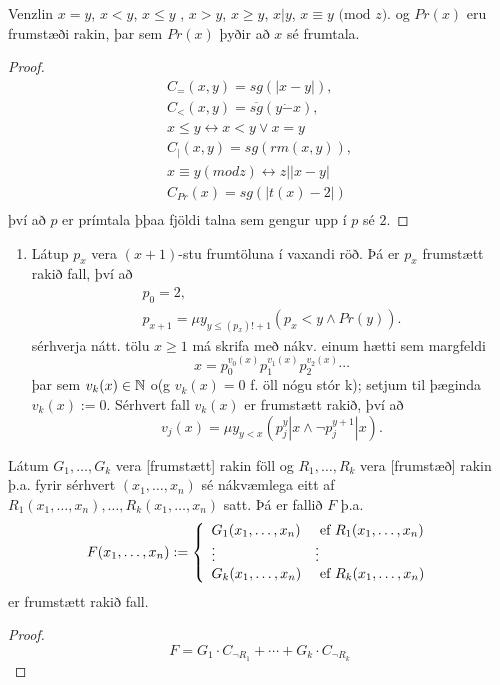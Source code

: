 \documentclass[12pt]{book}
\newcommand{\xxn}{x_1, \dotsc, x_n}
\newcommand{\dda}{\dot{-}}
\begin{document}
\begin{setn}
  Venzlin $x = y$, $x < y$, $x \leq y$ , $x > y$, $x \geq y$, $x | y$, $x \equiv y \text{ (mod } z)$.
  og $Pr(x)$ eru frumstæði rakin, þar sem $Pr(x)$ þyðir að $x$ sé frumtala.
  \begin{proof}
    \begin{gather*}
      C_=(x,y) = sg(|x-y|),\\
      C_<(x,y) = \overline{sg}(y \dda x),\\
      x \leq y \leftrightarrow x < y \vee x = y\\
      C_|(x,y) = sg(rm(x,y)),\\
      x \equiv y (mod z) \leftrightarrow z | |x-y|\\
      C_{Pr} (x) = sg(|t(x)-2|)\\
    \end{gather*}
    því að $p$ er prímtala þþaa fjöldi talna sem gengur upp í $p$ sé $2$.
  \end{proof}
\end{setn}

\begin{daemi}
  \begin{enumerate}[(1)]
  \item Látup $p_x$ vera $(x+1)$-stu frumtöluna í vaxandi röð. Þá
    er $p_x$ frumstætt rakið fall, því að
    \begin{gather*}
      p_0 = 2,\\
      p_{x+1} = \mu y_{y \leq (p_x)!+1} (p_x < y \wedge Pr(y)).
    \end{gather*}
    sérhverja nátt. tölu $x\geq 1$ má skrifa með
    nákv. einum hætti sem margfeldi
    \[ x = p_0^{v_0(x)} p_1^{v_1(x)} p_2^{v_2(x)} \dotsb \]
    þar sem $v_k(x) \in \mathbb{N}$ o(g $v_k(x) = 0$ f. öll nógu stór k);
    setjum til þæginda
    $v_k(x) := 0$. Sérhvert fall $v_k(x)$ er frumstætt rakið, því að
    \[ v_j(x) = \mu y_{y < x}(p_j^y | x \wedge \lnot p_j^{y+1} | x).\]
  \end{enumerate}
\end{daemi}

\begin{setn}
 Látum $G_1, \dotsc, G_k$ vera [frumstætt] rakin föll og $R_1, \dotsc, R_k$ vera
 [frumstæð] rakin þ.a. fyrir sérhvert $(\xxn)$ sé nákvæmlega eitt
 af $R_1(\xxn), \dotsc, R_k(\xxn)$ satt. Þá er fallið $F$ þ.a.
 \[ F(\xxn) := \bcondef G_1(\xxn) & \Ef R_1(\xxn)\\ \vdots & \vdots \\ G_k(\xxn) & \Ef R_k(\xxn) \econdef \]
 er frumstætt rakið fall.
 \begin{proof}
   \[F = G_1 \cdot C_{\lnot R_1} + \dotsb + G_k \cdot C_{\lnot R_k} \]
 \end{proof}
\end{setn}
\end{document}
